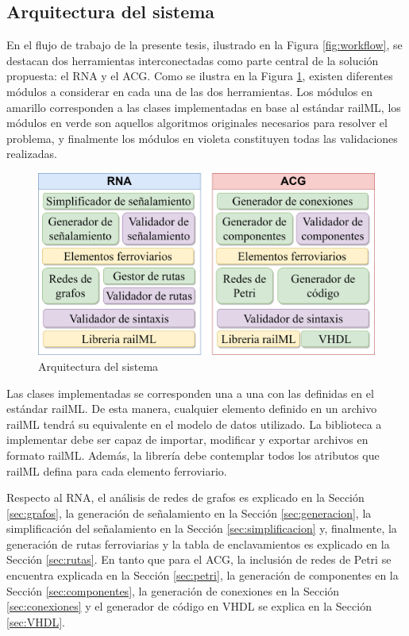\subsection{Arquitectura del sistema}

	En el flujo de trabajo de la presente tesis, ilustrado en la Figura \ref{fig:workflow}, se destacan dos herramientas interconectadas como parte central de la solución propuesta: el RNA y el ACG. Como se ilustra en la Figura \ref{fig:architecture}, existen diferentes módulos a considerar en cada una de las dos herramientas. Los módulos en amarillo corresponden a las clases implementadas en base al estándar railML, los módulos en verde son aquellos algoritmos originales necesarios para resolver el problema, y finalmente los módulos en violeta constituyen todas las validaciones realizadas.

    \begin{figure}[H]
        \centering
        \includegraphics[width=1\textwidth]{Figuras/Architecture.png}
        \centering\caption{Arquitectura del sistema}
        \label{fig:architecture}
    \end{figure}

    Las clases implementadas se corresponden una a una con las definidas en el estándar railML. De esta manera, cualquier elemento definido en un archivo railML tendrá su equivalente en el modelo de datos utilizado. La biblioteca a implementar debe ser capaz de importar, modificar y exportar archivos en formato railML. Además, la librería debe contemplar todos los atributos que railML defina para cada elemento ferroviario.

    Respecto al RNA, el análisis de redes de grafos es explicado en la Sección \ref{sec:grafos}, la generación de señalamiento en la Sección \ref{sec:generacion}, la simplificación del señalamiento en la Sección \ref{sec:simplificacion} y, finalmente, la generación de rutas ferroviarias y la tabla de enclavamientos es explicado en la Sección \ref{sec:rutas}. En tanto que para el ACG, la inclusión de redes de Petri se encuentra explicada en la Sección \ref{sec:petri}, la generación de componentes en la Sección \ref{sec:componentes}, la generación de conexiones en la Sección \ref{sec:conexiones} y el generador de código en VHDL se explica en la Sección \ref{sec:VHDL}.